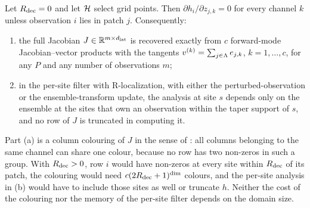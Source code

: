 \begin{proposition}
\label{prop:blockdiag}
Let $R_{\mathrm{dec}}=0$ and let $\mathcal{H}$ select grid points. Then
$\partial h_i/\partial z_{j,k} = 0$ for every channel $k$ unless
observation $i$ lies in patch $j$. Consequently:
\begin{enumerate}
\item[(a)] the full Jacobian $J\in\mathbb{R}^{m\times d_{\mathrm{lat}}}$ is recovered exactly
  from $c$ forward-mode Jacobian--vector products with the tangents
  $v^{(k)} = \sum_{j\in\Lambda} e_{j,k}$, $k=1,\dots,c$, for any $P$ and any
  number of observations $m$;
\item[(b)] in the per-site filter with R-localization, with either the
  perturbed-observation or the ensemble-transform update, the analysis at
  site $s$ depends only on the ensemble at the sites that own an
  observation within the taper support of $s$, and no row of $J$ is
  truncated in computing it.
\end{enumerate}
\end{proposition}

Part (a) is a column colouring of $J$ in the sense of
\citet{curtis1974}: all columns belonging to the same channel can share
one colour, because no row has two non-zeros in such a group. With
$R_{\mathrm{dec}}>0$, row $i$ would have non-zeros at every site within $R_{\mathrm{dec}}$ of
its patch, the colouring would need $c(2R_{\mathrm{dec}}+1)^{\dim}$ colours, and the
per-site analysis in (b) would have to include those sites as well or
truncate $h$. Neither the cost of the colouring nor the memory of the
per-site filter depends on the domain size.

